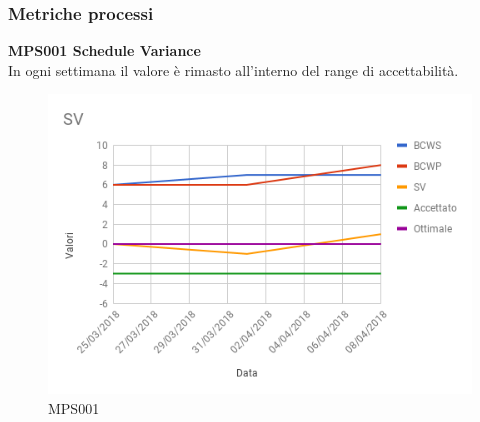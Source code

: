 \documentclass[PianoDiQualifica.tex]{subfiles}
\begin{document}
\subsubsection{Metriche processi}

\textbf{MPS001 Schedule Variance}\\
In ogni settimana il valore è rimasto all'interno del range di accettabilità.
\begin{figure}[H]
	\centering
	\includegraphics[width=0.7\linewidth]{RQ/SV}
	\caption{MPS001}
	\label{fig:processi}
\end{figure}
\newpage
\end{document}
